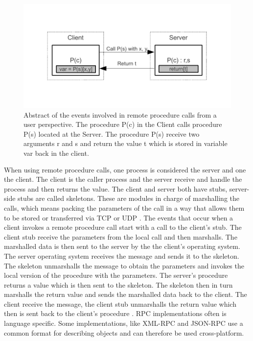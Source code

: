 \begin{figure}[t]
		\centering
    	\includegraphics{part_2/remote_procedure_calls/rpc.pdf}
		\caption{Abstract of the events involved in remote procedure calls from a user perspective.
The procedure P(c) in the Client calls procedure P(s) located at the Server. The procedure P(s) receive two arguments r and s and return the value t which is stored in variable var back in the client.}
		\label{rpc} 
\end{figure}

When using remote procedure calls, one process is considered the server and one the client. The client is the caller process and the server receive and handle the process and then returns the value. The client and server both have stubs, server-side stubs are called skeletons. These are modules in charge of marshalling the calls, which means packing the parameters of the call in a way that allows them to be stored or transferred via TCP or UDP \cite{rfc5531}. 
The events that occur when a client invokes a remote procedure call start with a call to the client's stub. The client stub receive the parameters from the local call and then marshalls. The marshalled data is then sent to the server by the the client's operating system. The server operating system receives the message and sends it to the skeleton. The skeleton unmarshalls the message  to obtain the parameters and invokes the local version of the procedure with the parameters. The server's procedure returns a value which is then sent to the skeleton. The skeleton then in turn marshalls the return value and sends the marshalled data back to the client. The client receive the message, the client stub unmarshalls the return value which then is sent back to the client's procedure \cite{Lewandowski97interprocesscommunication}. RPC implementations often is language specific. Some implementations, like XML-RPC and 
JSON-RPC use a common format for describing objects and can therefore be used cross-platform.

